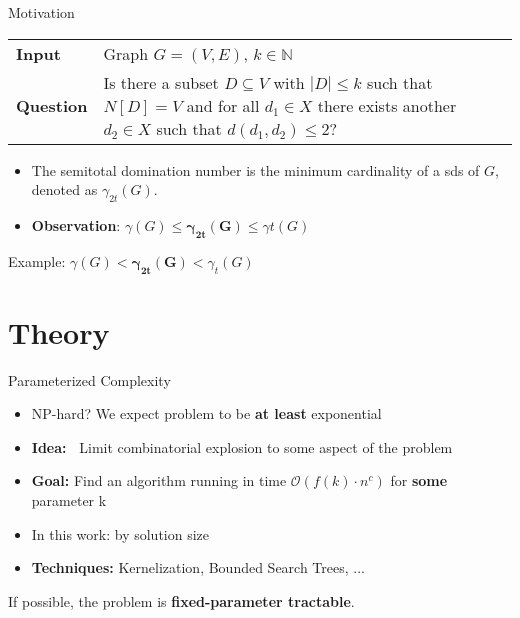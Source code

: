 \begin{frame}[c]{Motivation}
\begin{tcolorbox}[colback=TUMBlueLighter,title=\sdom]
    \begin{tabularx}{1.0\textwidth}{>{\hsize=0.30\hsize}X>{\hsize=0.8\hsize}X}
        \textbf{Input}    & Graph $G = (V, E)$, $k \in \mathbb{N}$\\
    \textbf{Question} & Is there a subset $D \subseteq V$ with $|D| \leq k$ such that ${N[D] = V}$ and for all $d_1 \in X$ there exists another $d_2 \in X$ such that ${d(d_1, d_2) \leq 2}$?
    \end{tabularx}
\end{tcolorbox}

\begin{itemize}
    \item The semitotal domination number is the minimum cardinality of a sds of $G$, denoted as $\gamma_{2t}(G)$.
    \item \textbf{Observation}: $\gamma(G) \leq  \mathbf{\gamma_{2t}(G)}  \leq \gamma{t}(G)$
\end{itemize}
\end{frame}

\begin{frame}[c]{Example: $\gamma(G) < \mathbf{\gamma_{2t}(G)} < \gamma_t(G)$}
\begin{figure}[!ht]
    \end{figure}
\end{frame}

\section{Theory}
\begin{frame}[c]{Parameterized Complexity}
    \begin{itemize}
        \item NP-hard? We expect problem to be  \textbf{at least} exponential \\
        \item \textbf{Idea:~} Limit combinatorial explosion to some aspect of the problem\\
        \item \textbf{Goal: } Find an algorithm running in time $\mathcal{O}(f(k) \cdot n^c)$ for \textbf{some} parameter k
        \item In this work: by solution size
        \item \textbf{Techniques: } Kernelization, Bounded Search Trees, ... 
    \end{itemize}

If possible, the problem is \textbf{fixed-parameter tractable}.

\end{frame}

